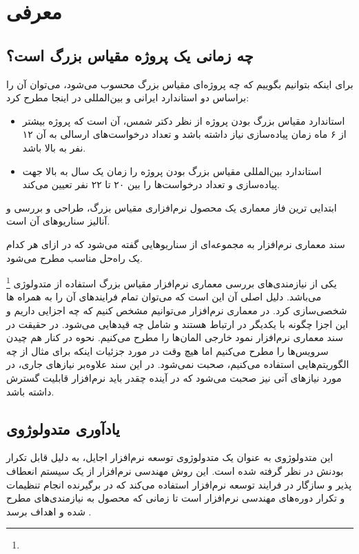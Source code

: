 \section{معرفی}

\subsection{چه زمانی یک پروژه مقیاس بزرگ است؟}

برای اینکه بتوانیم بگوییم که چه پروژه‌ای مقیاس بزرگ محسوب می‌شود، می‌توان آن را
براساس دو استاندارد ایرانی و بین‌المللی ‌در اینجا مطرح کرد:

\begin{itemize}
    \item استاندارد مقیاس بزرگ بودن پروژه از نظر دکتر شمس، آن است که پروژه بیشتر
    از ۶ ماه زمان پیا‌ده‌سازی نیاز داشته باشد و تعداد درخواست‌های ارسالی به آن
    ۱۲ نفر به بالا باشد.
    \item استاندارد بین‌المللی مقیاس بزرگ بودن پروژه را زمان یک سال به بالا جهت
    پیاده‌سازی و تعداد درخواست‌ها را بین ۲۰ تا ۲۲ نفر تعیین می‌کند.
\end{itemize}

ابتدایی ترین فاز معماری یک محصول نرم‌افزاری مقیاس بزرگ، طراحی و بررسی و آنالیز
سناریو‌های آن است.

سند معماری نرم‌افزار به مجموعه‌ای از سناریو‌هایی گفته می‌شود که در ازای هر کدام
یک راه‌حل مناسب مطرح می‌شود.

یکی از نیازمندی‌های بررسی معماری نرم‌افزار مقیاس بزرگ استفاده از متدولوژی
\footnote{} می‌باشد. دلیل اصلی آن این است
که می‌توان تمام فرایند‌های آن را به همراه ها شخصی‌سازی کرد. در
معماری نرم‌افزار می‌توانیم مشخص کنیم که چه اجزایی داریم و این اجزا چگونه با
یکدیگر در ارتباط هستند و شامل چه قید‌هایی می‌شود. در حقیقت در سند معماری
نرم‌افزار نمود خارجی المان‌ها را مطرح می‌کنیم. نحوه در کنار هم چیدن سرویس‌ها را
مطرح می‌کنیم اما هیچ وقت در مورد جزئیات اینکه برای مثال از چه الگوریتم‌هایی
استفاده می‌کنیم، صحبت نمی‌شود. در این سند علاوه‌بر نیاز‌های جاری، در مورد
نیاز‌های آتی نیز صحبت می‌شود که در آینده چقدر باید نرم‌افزار قابلیت گسترش
 داشته باشد.

\subsection{یادآوری متدولوژوی }

این متدولوژوی به عنوان یک متدولوژوی توسعه نرم‌افزار اجایل، به دلیل قابل تکرار
بودنش در نظر گرفته شده است. این روش مهندسی نرم‌افزار از یک سیستم انعطاف پذیر و
سازگار در فرایند توسعه نرم‌افزار استفاده می‌کند که در برگیرنده انجام تنظیمات و
تکرار دوره‌های مهندسی نرم‌افزار است تا زمانی که محصول به نیازمندی‌های مطرح شده و
اهداف برسد \cite{rupStudy}.


